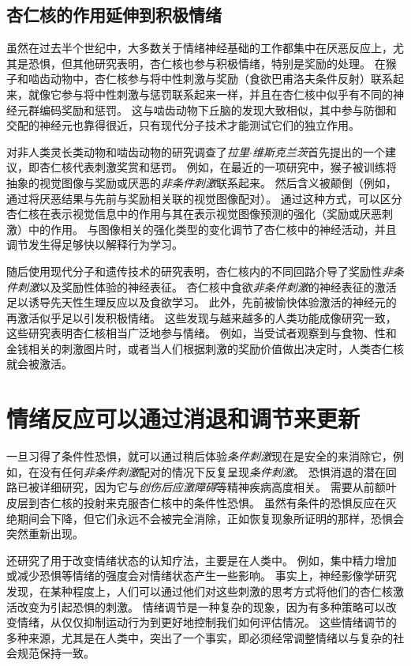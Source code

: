 \subsection{杏仁核的作用延伸到积极情绪}

虽然在过去半个世纪中，大多数关于情绪神经基础的工作都集中在厌恶反应上，尤其是恐惧，但其他研究表明，杏仁核也参与积极情绪，特别是奖励的处理。
在猴子和啮齿动物中，杏仁核参与将中性刺激与奖励（食欲巴甫洛夫条件反射）联系起来，就像它参与将中性刺激与惩罚联系起来一样，并且在杏仁核中似乎有不同的神经元群编码奖励和惩罚。
这与啮齿动物下丘脑的发现大致相似，其中参与防御和交配的神经元也靠得很近，只有现代分子技术才能测试它们的独立作用。


对非人类灵长类动物和啮齿动物的研究调查了\textit{拉里$\cdot$维斯克兰茨}首先提出的一个建议，即杏仁核代表刺激奖赏和惩罚。
例如，在最近的一项研究中，猴子被训练将抽象的视觉图像与奖励或厌恶的\textit{非条件刺激}联系起来。
然后含义被颠倒（例如，通过将厌恶结果与先前与奖励相关联的视觉图像配对）。
通过这种方式，可以区分杏仁核在表示视觉信息中的作用与其在表示视觉图像预测的强化（奖励或厌恶刺激）中的作用。
与图像相关的强化类型的变化调节了杏仁核中的神经活动，并且调节发生得足够快以解释行为学习。


随后使用现代分子和遗传技术的研究表明，杏仁核内的不同回路介导了奖励性\textit{非条件刺激}以及奖励性体验的神经表征。
杏仁核中食欲\textit{非条件刺激}的神经表征的激活足以诱导先天性生理反应以及食欲学习。
此外，先前被愉快体验激活的神经元的再激活似乎足以引发积极情绪。
这些发现与越来越多的人类功能成像研究一致，这些研究表明杏仁核相当广泛地参与情绪。
例如，当受试者观察到与食物、性和金钱相关的刺激图片时，或者当人们根据刺激的奖励价值做出决定时，人类杏仁核就会被激活。



\section{情绪反应可以通过消退和调节来更新}

一旦习得了条件性恐惧，就可以通过稍后体验\textit{条件刺激}现在是安全的来消除它，例如，在没有任何\textit{非条件刺激}配对的情况下反复呈现\textit{条件刺激}。
恐惧消退的潜在回路已被详细研究，因为它与\textit{创伤后应激障碍}等精神疾病高度相关。
需要从前额叶皮层到杏仁核的投射来克服杏仁核中的条件性恐惧。
虽然有条件的恐惧反应在灭绝期间会下降，但它们永远不会被完全消除，正如恢复现象所证明的那样，恐惧会突然重新出现。


还研究了用于改变情绪状态的认知疗法，主要是在人类中。
例如，集中精力增加或减少恐惧等情绪的强度会对情绪状态产生一些影响。
事实上，神经影像学研究发现，在某种程度上，人们可以通过他们对这些刺激的思考方式将他们的杏仁核激活改变为引起恐惧的刺激。
情绪调节是一种复杂的现象，因为有多种策略可以改变情绪，从仅仅抑制运动行为到更好地控制我们如何评估情况。
这些情绪调节的多种来源，尤其是在人类中，突出了一个事实，即必须经常调整情绪以与复杂的社会规范保持一致。



